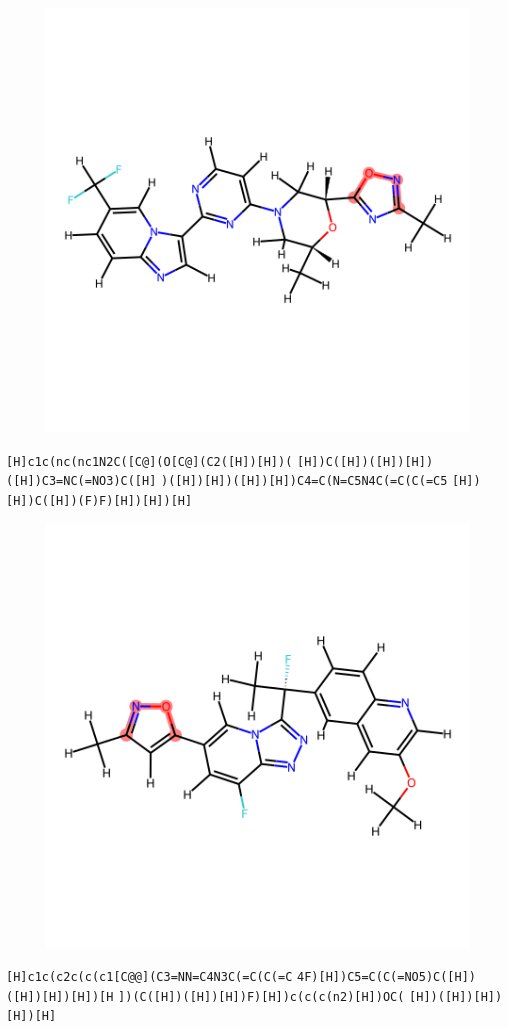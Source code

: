 \documentclass{article}
\begin{document}
\begin{figure}[ht]
\centering
    \includegraphics{mol164.png}
\end{figure}
\verb|[H]c1c(nc(nc1N2C([C@](O[C@](C2([H])[H])(| \verb|[H])C([H])([H])[H])([H])C3=NC(=NO3)C([H]| \verb|)([H])[H])([H])[H])C4=C(N=C5N4C(=C(C(=C5| \verb|[H])[H])C([H])(F)F)[H])[H])[H]|

\begin{figure}[ht]
\centering
    \includegraphics{mol165.png}
\end{figure}
\verb|[H]c1c(c2c(c(c1[C@@](C3=NN=C4N3C(=C(C(=C| \verb|4F)[H])C5=C(C(=NO5)C([H])([H])[H])[H])[H| \verb|])(C([H])([H])[H])F)[H])c(c(c(n2)[H])OC(| \verb|[H])([H])[H])[H])[H]|
\end{document}
